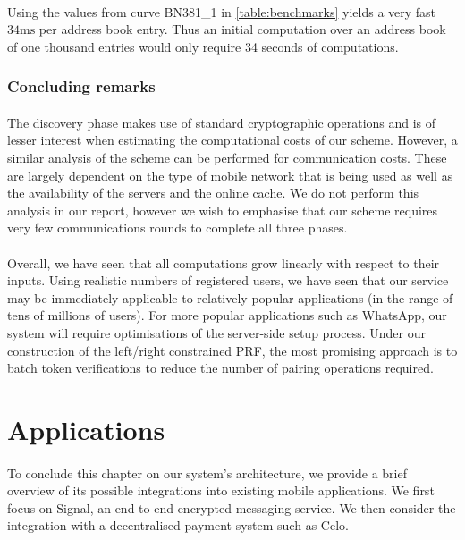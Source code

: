 	\paragraph{} Using the values from curve BN381\_1 in \autoref{table:benchmarks} yields  a very fast $34\mathrm{ms}$ per address book entry. Thus an initial computation over an address book of one thousand entries would only require 34 seconds of computations.
	
	\subsubsection{Concluding remarks}
	
	\paragraph{} The discovery phase makes use of standard cryptographic operations and is of lesser interest when estimating the computational costs of our scheme. However, a similar analysis of the scheme can be performed for communication costs. These are largely dependent on the type of mobile network that is being used as well as the availability of the servers and the online cache. We do not perform this analysis in our report, however we wish to emphasise that our scheme requires very few communications rounds to complete all three phases.
	
	
	\paragraph{} Overall, we have seen that all computations grow linearly with respect to their inputs. Using realistic numbers of registered users, we have seen that our service may be immediately applicable to relatively popular applications (in the range of tens of millions of users). For more popular applications such as WhatsApp, our system will require optimisations of the server-side setup process. Under our construction of the left/right constrained PRF, the most promising approach is to batch token verifications to reduce the number of pairing operations required. 
	
 	


\section{Applications}
\label{sec:applications}

\paragraph{} To conclude this chapter on our system's architecture, we provide a brief overview of its possible integrations into existing mobile applications. We first focus on Signal, an end-to-end encrypted messaging service. We then consider the integration with a decentralised payment system such as Celo.

